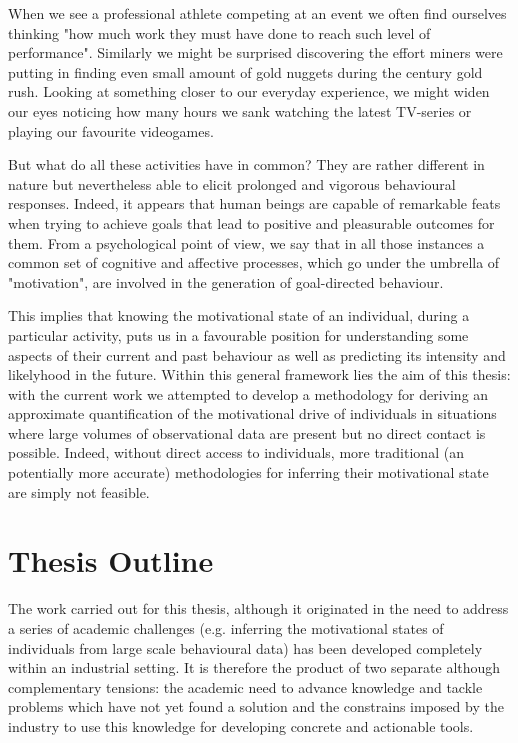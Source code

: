When we see a professional athlete competing at an event we often find ourselves thinking "how much work they must have done to reach such level of performance". Similarly we might be surprised discovering the effort miners were putting in finding even small amount of gold nuggets during the  century gold rush. Looking at something closer to our everyday experience, we might widen our eyes noticing how many hours we sank watching the latest TV-series or playing our favourite videogames. 

But what do all these activities have in common? They are rather different in nature but nevertheless able to elicit prolonged and vigorous behavioural responses. Indeed, it appears that human beings are capable of remarkable feats when trying to achieve goals that lead to positive and pleasurable outcomes for them. From a psychological point of view, we say that in all those instances a common set of cognitive and affective processes, which go under the umbrella of "motivation", are involved in the generation of goal-directed behaviour. 

This implies that knowing the motivational state of an individual, during a particular activity, puts us in a favourable position for understanding some aspects of their current and past behaviour as well as  predicting its intensity and likelyhood in the future. Within this general framework lies the aim of this thesis: with the current work we attempted to develop a methodology for deriving an approximate quantification of the motivational drive of individuals in situations where large volumes of observational data are present but no direct contact is possible. Indeed, without direct access to individuals, more traditional (an potentially more accurate) methodologies for inferring their motivational state are simply not feasible.

\section*{Thesis Outline}
The work carried out for this thesis, although it originated in the need to address a series of academic challenges (e.g. inferring the motivational states of individuals from large scale behavioural data) has been developed completely within an industrial setting. It is therefore the product of two separate although complementary tensions: the academic need to advance knowledge and tackle problems which have not yet found a solution and the constrains imposed by the industry to use this knowledge for developing concrete and actionable tools.

